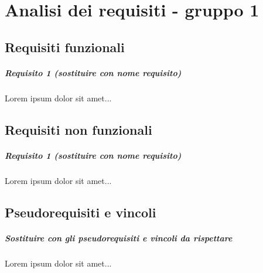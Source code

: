 
\chapter{Analisi dei requisiti - gruppo 1}
\label{ref:requisiti1}


\section{Requisiti funzionali}

\paragraph{Requisito 1 (sostituire con nome requisito) \\} 
Lorem ipsum dolor sit amet...

\section{Requisiti non funzionali}

\paragraph{Requisito 1 (sostituire con nome requisito) \\} 
Lorem ipsum dolor sit amet...

\section{Pseudorequisiti e vincoli}
\paragraph{Sostituire con gli pseudorequisiti e vincoli da rispettare \\}
Lorem ipsum dolor sit amet...

\newpage